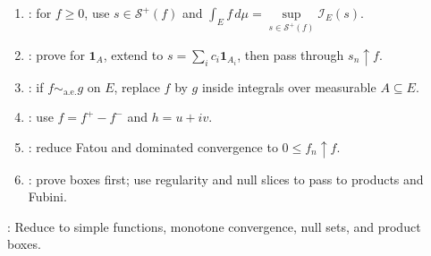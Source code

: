 \begin{method} \label{meth:lebesgue-product-proof-patterns} 
\begin{enumerate}[label=(\roman*)]
\setlength{\itemsep}{0pt}
\item {}: for $f\geq0$, use $s\in\mathcal{S}^+(f)$ and $\int_E f\,d\mu=\sup\limits_{s\in\mathcal{S}^+(f)}\mathcal{I}_E(s)$.
\item {}: prove for $\mathbf{1}_A$, extend to $s=\sum\limits_i c_i\mathbf{1}_{A_i}$, then pass through $s_n\uparrow f$.
\item {}: if $f\sim_{\mathrm{a.e.}}g$ on $E$, replace $f$ by $g$ inside integrals over measurable $A\subseteq E$.
\item {}: use $f=f^+-f^-$ and $h=u+iv$.
\item {}: reduce Fatou and dominated convergence to $0\leq f_n\uparrow f$.
\item {}: prove boxes first; use regularity and null slices to pass to products and Fubini.
\end{enumerate}
: Reduce to simple functions, monotone convergence, null sets, and product boxes.
\end{method}
